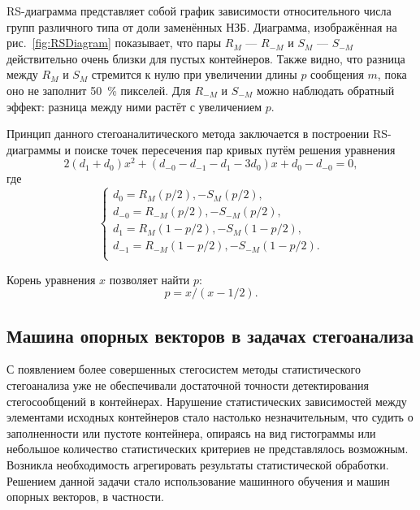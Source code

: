 RS-диаграмма представляет собой график зависимости относительного числа групп различного типа от доли заменённых НЗБ. Диаграмма, изображённая на рис.~\ref{fig:RSDiagram} показывает, что пары $ R_M $ --- $ R_{-M} $ и $ S_M $ --- $ S_{-M} $ действительно очень близки для пустых контейнеров. Также видно, что разница между $ R_M $  и $ S_M $ стремится к нулю при увеличении длины $ p $ сообщения $ m $, пока оно не заполнит 50~\% пикселей. Для $ R_{-M} $ и $ S_{-M} $ можно наблюдать обратный эффект: разница между ними растёт с увеличением $ p $.

Принцип данного стегоаналитического метода заключается в построении RS-диаграммы и поиске точек пересечения пар кривых путём решения уравнения
\begin{equation*}
2(d_1 + d_0)x^2 + (d_{-0} - d_{-1} - d_1 - 3{d_0})x + d_0 - d_{-0} = 0,
\end{equation*}
где
\begin{equation*}
\begin{cases}
d_0 = R_M(p/2), - S_M(p/2), \\
d_{-0} = R_{-M}(p/2), - S_{-M}(p/2), \\
d_1 = R_M(1 - p/2), - S_M(1 - p/2), \\
d_{-1} = R_{-M}(1 - p/2), - S_{-M}(1 - p/2). \\
\end{cases}
\end{equation*}

Корень уравнения $ x $ позволяет найти $ p $:
\begin{equation*}
p = x/(x - 1/2).
\end{equation*}

\subsection{Машина опорных векторов в задачах стегоанализа}

С появлением более совершенных стегосистем методы статистического стегоанализа уже не обеспечивали достаточной точности детектирования стегосообщений в контейнерах. Нарушение статистических зависимостей между элементами исходных контейнеров стало настолько незначительным, что судить о заполненности или пустоте контейнера, опираясь на вид гистограммы или небольшое количество статистических критериев не представлялось возможным. Возникла необходимость агрегировать результаты статистической обработки. Решением данной задачи стало использование машинного обучения и машин опорных векторов, в частности.

